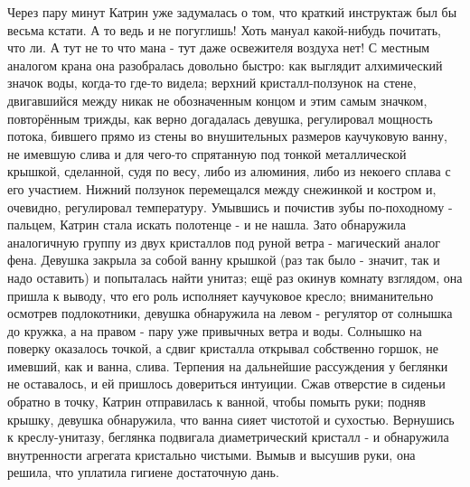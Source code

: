 Через пару минут Катрин уже задумалась о том, что краткий инструктаж был бы весьма кстати. А то ведь и не погуглишь! Хоть мануал какой-нибудь почитать, что ли. А тут не то что мана - тут даже освежителя воздуха нет! С местным аналогом крана она разобралась довольно быстро: как выглядит алхимический значок воды, когда-то где-то видела; верхний кристалл-ползунок на стене, двигавшийся между никак не обозначенным концом и этим самым значком, повторённым трижды, как верно догадалась девушка, регулировал мощность потока, бившего прямо из стены во внушительных размеров каучуковую ванну, не имевшую слива и для чего-то спрятанную под тонкой металлической крышкой, сделанной, судя по весу, либо из алюминия, либо из некоего сплава с его участием. Нижний ползунок перемещался между снежинкой и костром и, очевидно, регулировал температуру. Умывшись и почистив зубы по-походному - пальцем, Катрин стала искать полотенце - и не нашла. Зато обнаружила аналогичную группу из двух кристаллов под руной ветра - магический аналог фена. Девушка закрыла за собой ванну крышкой (раз так было - значит, так и надо оставить) и попыталась найти унитаз; ещё раз окинув комнату взглядом, она пришла к выводу, что его роль исполняет каучуковое кресло; вниманительно осмотрев подлокотники, девушка обнаружила на левом - регулятор от солнышка до кружка, а на правом - пару уже привычных ветра и воды.
Солнышко на поверку оказалось точкой, а сдвиг кристалла открывал собственно горшок, не имевший, как и ванна, слива. Терпения на дальнейшие рассуждения у беглянки не оставалось, и ей пришлось довериться интуиции. Сжав отверстие в сиденьи обратно в точку, Катрин отправилась к ванной, чтобы помыть руки; подняв крышку, девушка обнаружила, что ванна сияет чистотой и сухостью. Вернушись к креслу-унитазу, беглянка подвигала диаметрический кристалл - и обнаружила внутренности агрегата кристально чистыми. Вымыв и высушив руки, она решила, что уплатила гигиене достаточную дань.

